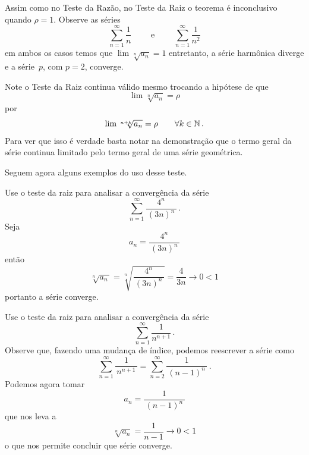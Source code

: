 Assim como no Teste da Razão, no Teste da Raiz o teorema é inconclusivo
quando $\rho=1$. Observe as séries
\[
  \sum_{n=1}^\infty \frac{1}{n}
  \qquad \text{ e } \qquad
  \sum_{n=1}^\infty \frac{1}{n^2}
\]
em ambos os casos temos que
\(
  \lim \sqrt[n]{a_n}=1
\)
entretanto, a série harmônica diverge e a série~$p$, com $p=2$, converge.

Note o Teste da Raiz continua válido mesmo trocando a hipótese de que
\[
  \lim \sqrt[n]{a_n} = \rho
\]
por
\begin{equation}
  \label{eq:teste-raiz-variacao}
  \lim \sqrt[n+k]{a_n} = \rho \qquad \forall k \in \mathbb{N}     \,.
\end{equation}
Para ver que isso é verdade basta notar na demonstração que o termo geral
da série continua limitado pelo termo geral de uma série geométrica.

Seguem agora alguns exemplos do uso desse teste.

\begin{example}
  Use o teste da raiz para analisar a convergência da série
  \[
    \sum_{n=1}^\infty \frac{4^n}{\,(3n)^n\,}         \,.
  \]
  \solution
  Seja
  \[
    a_n = \frac{4^n}{\,(3n)^n\,}
  \]
  então
  \[
    \sqrt[n]{a_n\,} = \sqrt[n]{\frac{4^n}{\,(3n)^n\,}}
                    = \frac{4}{3n}
                    \to 0 < 1
  \]
  portanto a série converge.
\end{example}

\begin{example}
  Use o teste da raiz para analisar a convergência da série
  \[
    \sum_{n=1}^\infty\frac{1}{n^{n+1}}     \,.
  \]
  \solution
  Observe que, fazendo uma mudança de índice, podemos reescrever a série como
  \[
    \sum_{n=1}^\infty\frac{1}{\, n^{n+1}\,} =
    \sum_{n=2}^\infty\frac{1}{\,(n-1)^{n}\,}       \,.
  \]
  Podemos agora tomar
  \[
    a_n = \frac{1}{\,(n-1)^{n}\,}
  \]
  que nos leva a
  \[
    \sqrt[n]{a_n} = \frac{1}{n-1} \to 0 < 1
  \]
  o que nos permite concluir que série converge.
\end{example}


